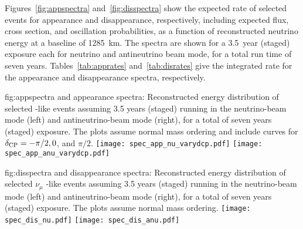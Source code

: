 Figures~\ref{fig:appspectra} and~\ref{fig:disspectra} show the expected rate of selected events for \nue appearance and \numu disappearance, respectively, including expected flux, cross section, and oscillation probabilities, as a function of reconstructed neutrino energy at a baseline of
\num{1285}~km. The spectra are shown for a \num{3.5}~year (staged) exposure each for neutrino and antineutrino beam mode, for a total run time of seven %
years. Tables~\ref{tab:apprates} and~\ref{tab:disrates} give the integrated rate for the \nue %
appearance and \numu %
disappearance spectra, respectively.  

\begin{dunefigure}{fig:appspectra}
{\nue and \anue appearance spectra: Reconstructed energy distribution of selected \nue {}-like events assuming 3.5 years (staged) running in the neutrino-beam mode (left) and antineutrino-beam mode (right), for a total of seven years (staged) exposure.  The plots assume normal mass ordering and include curves for $\delta_{\rm CP} = -\pi/2, 0$, and $\pi/2$.}
 \texttt{[image: spec\_app\_nu\_varydcp.pdf]}
 \texttt{[image: spec\_app\_anu\_varydcp.pdf]}
\end{dunefigure}



\begin{dunefigure}{fig:disspectra}
{\numu and \anumu disappearance spectra: Reconstructed energy distribution of selected $\nu_{\mu}$ -like events assuming 3.5 years (staged) running in the neutrino-beam mode (left) and antineutrino-beam mode (right), for a total of seven years (staged) exposure. The plots assume normal mass ordering.}
\texttt{[image: spec\_dis\_nu.pdf]}
\texttt{[image: spec\_dis\_anu.pdf]}
\end{dunefigure}



